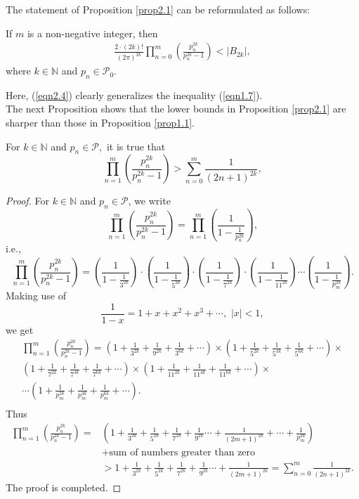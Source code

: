 \documentclass[eqnumis, pdf]{yjb}
\begin{document}
\begin{remark} The statement of Proposition \ref{prop2.1} can be reformulated as follows: 

 If $ m $ is a non-negative integer, then 
\begin{align}\label{eqn2.4}
\frac{2 \cdot (2k)!}{(2\pi)^{2k}} \prod_{n=0}^m \left(\frac{p_n^{2k}}{p_n^{2k}-1}\right) < \vert B_{2k} \vert , 
\end{align}
where $k \in \mathbb{N} $ and $p_n \in \mathcal{P}_0.$  
\end{remark}
Here, (\ref{eqn2.4}) clearly generalizes the inequality (\ref{eqn1.7}). \\

The next Proposition shows that the lower bounds in Proposition \ref{prop2.1} are sharper than those in Proposition \ref{prop1.1}.
\begin{proposition}\label{prop2.2}
For $k \in \mathbb{N} $ and $p_n \in \mathcal{P},$ it is true that
$$ \prod_{n=1}^m \left(\frac{p_n^{2k}}{p_n^{2k}-1}\right) > \sum_{n=0}^m \frac{1}{(2n+1)^{2k}}, $$  
\end{proposition}
\begin{proof}
For $k \in \mathbb{N} $ and $p_n \in \mathcal{P}$, we write
$$ \prod_{n=1}^m \left(\frac{p_n^{2k}}{p_n^{2k}-1}\right) = \prod_{n=1}^m \left(\frac{1}{1-\frac{1}{p_n^{2k}}}\right), $$ i.e.,
$$\prod_{n=1}^m \left(\frac{p_n^{2k}}{p_n^{2k}-1}\right) = \left(\frac{1}{1-\frac{1}{3^{2k}}}\right) \cdot \left(\frac{1}{1-\frac{1}{5^{2k}}}\right) \cdot \left(\frac{1}{1-\frac{1}{7^{2k}}}\right) \cdot \left(\frac{1}{1-\frac{1}{11^{2k}}}\right) \cdots \left(\frac{1}{1-\frac{1}{p_m^{2k}}}\right).$$ Making use of $$ \frac{1}{1-x} = 1 + x + x^2 + x^3 + \cdots, \, \, \vert x \vert < 1, $$ we get
\begin{multline}\nonumber
\prod_{n=1}^m \left(\frac{p_n^{2k}}{p_n^{2k}-1}\right) = \left( 1 + \frac{1}{3^{2k}} + \frac{1}{9^{2k}} + \frac{1}{3^{6k}} + \cdots \right) \times \left( 1 + \frac{1}{5^{2k}} + \frac{1}{5^{4k}} + \frac{1}{5^{6k}} + \cdots \right) \times  \\ 
\left( 1 + \frac{1}{7^{2k}} + \frac{1}{7^{4k}} + \frac{1}{7^{6k}} + \cdots \right) \times \left( 1 + \frac{1}{11^{2k}} + \frac{1}{11^{4k}} + \frac{1}{11^{6k}} + \cdots \right) \times \\
\cdots \left( 1 + \frac{1}{p_m^{2k}} + \frac{1}{p_m^{4k}} + \frac{1}{p_m^{6k}} + \cdots \right).\\
\end{multline}
Thus 
\begin{align*}
\prod_{n=1}^m \left(\frac{p_n^{2k}}{p_n^{2k}-1}\right) = &\left(1 + \frac{1}{3^{2k}} + \frac{1}{5^{2k}} + \frac{1}{7^{2k}} + \frac{1}{9^{2k}} \cdots + \frac{1}{(2m+1)^{2k}} + \cdots + \frac{1}{p_m^{2k}}\right) \\
&+ \text{sum of numbers greater than zero} \\
&> 1 + \frac{1}{3^{2k}} + \frac{1}{5^{2k}} + \frac{1}{7^{2k}} + \frac{1}{9^{2k}} \cdots + \frac{1}{(2m+1)^{2k}} = \sum_{n=0}^m \frac{1}{(2n+1)^{2k}}.
\end{align*}
The proof is completed.
\end{proof}
\end{document}
